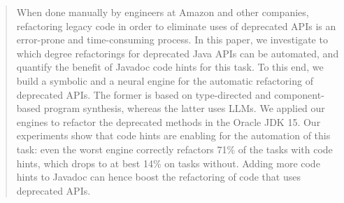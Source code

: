 \documentclass[sigconf]{acmart}
\begin{document}
\begin{abstract}
%
When done manually by engineers at Amazon and other companies, refactoring legacy code in order to eliminate uses of
deprecated APIs is an error-prone and time-consuming process.  In this
paper, we investigate to which degree refactorings for deprecated Java APIs
can be automated, and quantify the benefit of Javadoc code hints for this
task.  To this end, we build a symbolic and a neural engine for the
automatic refactoring of deprecated APIs.  The former is based on
type-directed and component-based program synthesis, whereas the latter uses
LLMs.  We applied our engines to refactor the deprecated methods in the
Oracle JDK 15.  Our experiments show that code hints are enabling for the
automation of this task: even the worst engine correctly refactors 71\% of
the tasks with code hints, which drops to at best 14\% on tasks without.
Adding more code hints to Javadoc can hence boost the refactoring of code
that uses deprecated APIs.
%

%
\end{abstract}
\end{document}
